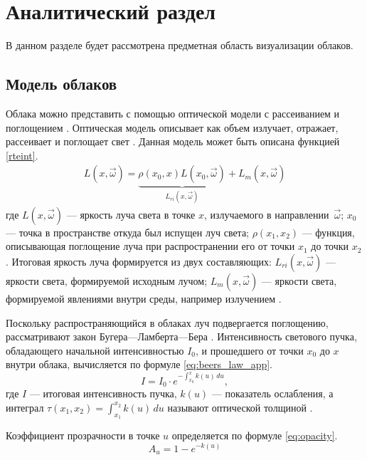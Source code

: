 \chapter{Аналитический раздел}

В данном разделе будет рассмотрена предметная область визуализации облаков.

\section{Модель облаков}
\label{math}
Облака можно представить с помощью оптической модели с рассеиванием и поглощением \cite{partmedia, frostbite, hzd, clouds}.
Оптическая модель описывает как объем излучает, отражает, рассеивает и поглощает свет \cite{rtvg}.
Данная модель может быть описана функцией \eqref{rteint}.
\begin{equation}
	\label{rteint}
	\begin{aligned}
		L(x, \vec{\omega}) =
		\underbrace{\rho(x_0, x) L(x_0, \vec{\omega})}_{L_{ri}(x, \vec{\omega})} + L_m(x, \vec{\omega})
	\end{aligned}
\end{equation}
где $L(x, \vec{\omega})$ --- яркость луча света в точке $x$, излучаемого в направлении~$\vec{\omega}$; $x_0$ --- точка в пространстве откуда был испущен луч света; $\rho(x_1, x_2)$ --- функция, описывающая поглощение луча при распространении его от точки $x_1$ до точки $x_2$. Итоговая яркость луча формируется из двух составляющих: $ L_{ri}(x, \vec{\omega}) $ --- яркости света, формируемой исходным лучом; $ L_m(x, \vec{\omega}) $ --- яркости света, формируемой явлениями внутри среды, например излучением \cite{partmedia}.  

Поскольку распространяющийся в облаках луч подвергается поглощению, рассматривают закон Бугера---Ламберта---Бера \cite{partmedia, rtvg}. Интенсивность светового пучка, обладающего начальной интенсивностью $I_0$, и прошедшего от точки $x_0$ до $x$ внутри облака, вычисляется по формуле \eqref{eq:beers_law_app}.
\begin{equation}
	\label{eq:beers_law_app}
	I = I_0 \cdot e^{-\int_{x_0}^{x} k(u)\,du},
\end{equation}
где $I$ --- итоговая интенсивность пучка, $k(u)$ --- показатель ослабления, а интеграл $ \tau(x_1, x_2) = \int_{x_1}^{x_2} k(u)\,du$ называют оптической толщиной \cite{partmedia, rtvg, hzd, frostbite}.

Коэффициент прозрачности в точке $u$ определяется по формуле \eqref{eq:opacity}.
\begin{equation}
	\label{eq:opacity}
	A_u = 1 - e^{-k(u)}
\end{equation}

